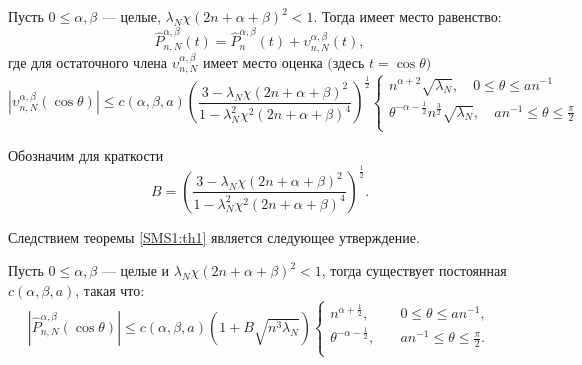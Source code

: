\begin{theorem}
\label{SMS1:th1}
    Пусть $0 \leq \alpha,\beta$ --- целые, $\lambda_N \chi(2n+\alpha+\beta)^2 < 1$. Тогда имеет место равенство:
    \begin{equation*}
    \hat{P}_{n,N}^{\alpha,\beta}(t) = \hat{P}_{n}^{\alpha,\beta}(t) + \upsilon_{n,N}^{\alpha,\beta}(t),
    \end{equation*}
    где для остаточного члена $\upsilon_{n,N}^{\alpha,\beta}$ имеет место оценка $($здесь $t=\cos\theta)$
    \begin{equation*}
    \left|\upsilon_{n,N}^{\alpha,\beta}(\cos{\theta})\right| \leq
    c(\alpha,\beta, a) \left( \frac{3-\lambda_N \chi (2n+\alpha+\beta)^2}{1-\lambda_N^2 \chi^2 (2n+\alpha+\beta)^4} \right)^{\frac{1}{2}}
    \left\{
    \begin{aligned}
    n^{\alpha+2}\sqrt{\lambda_N},\quad 0\leq\theta\leq an^{-1}\\
    \theta^{-\alpha-\frac{1}{2}}n^{\frac{3}{2}}\sqrt{\lambda_N},\quad an^{-1}\leq\theta\leq \frac{\pi}{2}\\
    \end{aligned}
    \right.
    \end{equation*}
\end{theorem}
\noindent Обозначим для краткости
\begin{equation*}
B = \left( \frac{3-\lambda_N \chi (2n+\alpha+\beta)^2}{1-\lambda_N^2 \chi^2 (2n+\alpha+\beta)^4} \right)^{\frac{1}{2}}.
\end{equation*}

\noindent Следствием теоремы \ref{SMS1:th1} является следующее утверждение.

\begin{theorem}
\label{SMS1:th2}
    Пусть $0 \leq \alpha,\beta$ --- целые и $\lambda_N \chi(2n+\alpha+\beta)^2 < 1$, тогда существует постоянная $c(\alpha,\beta,a)$, такая что:
    \begin{equation*}
    \left|\hat{P}_{n,N}^{\alpha,\beta}(\cos{\theta})\right| \leq
    c(\alpha,\beta,a) \left(1 + B\sqrt{n^{3}\lambda_N}\right)
    \left\{
    \begin{aligned}
    n^{\alpha+\frac12},& \quad 0\leq \theta \leq an^{-1},\\
    \theta^{-\alpha-\frac12},& \quad an^{-1}\leq \theta \leq \frac{\pi}{2}.\\
    \end{aligned}
    \right.
    \end{equation*}
\end{theorem}



